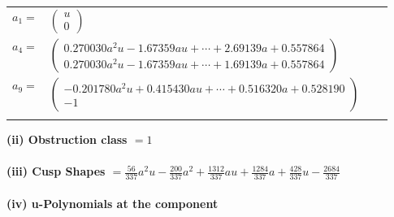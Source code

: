 \documentclass[1p]{elsarticle_modified}
\theoremstyle{definition}
\begin{document}
\begin{tabular}{m{7pt} m{180pt} m{7pt} m{180pt} }
\flushright $a_{1}=$&$\begin{pmatrix}u\\0\end{pmatrix}$ \\
\flushright $a_{4}=$&$\begin{pmatrix}0.270030 a^{2} u-1.67359 a u+\cdots+2.69139 a+0.557864\\0.270030 a^{2} u-1.67359 a u+\cdots+1.69139 a+0.557864\end{pmatrix}$ \\
\flushright $a_{9}=$&$\begin{pmatrix}-0.201780 a^{2} u+0.415430 a u+\cdots+0.516320 a+0.528190\\-1\end{pmatrix}$\\&\end{tabular}
\flushleft \textbf{(ii) Obstruction class $= 1$}\\~\\
\flushleft \textbf{(iii) Cusp Shapes $= \frac{56}{337} a^2 u-\frac{200}{337} a^2+\frac{1312}{337} a u+\frac{1284}{337} a+\frac{428}{337} u-\frac{2684}{337}$}\\~\\
\newpage\renewcommand{\arraystretch}{1}
\flushleft \textbf{(iv) u-Polynomials at the component}\newline \\
\end{document}

